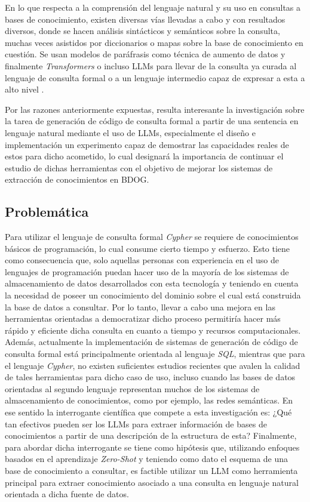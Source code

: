En lo que respecta a la comprensión del lenguaje natural y su uso en consultas a bases de conocimiento, existen diversas vías llevadas a cabo y con resultados diversos, donde se hacen análisis sintácticos y semánticos sobre la consulta, muchas veces asistidos por diccionarios o mapas sobre la base de conocimiento en cuestión. Se usan modelos de paráfrasis como técnica de aumento de datos y finalmente \textit{Transformers} o incluso LLMs para llevar de la consulta ya curada al lenguaje de consulta formal o a un lenguaje intermedio capaz de expresar a esta a alto nivel \cite{text2sql1} \cite{text2cypher1}.

Por las razones anteriormente expuestas, resulta interesante la investigación sobre la tarea de generación de código de consulta formal a partir de una sentencia en lenguaje natural mediante el uso de LLMs, especialmente el diseño e implementación un experimento capaz de demostrar las capacidades reales de estos para dicho acometido, lo cual designará la importancia de continuar el estudio de dichas herramientas con el objetivo de mejorar los sistemas de extracción de conocimientos en BDOG.

\subsection*{Problemática}
Para utilizar el lenguaje de consulta formal \textit{Cypher} se requiere de conocimientos básicos de programación, lo cual consume cierto tiempo y esfuerzo. Esto tiene como consecuencia que, solo aquellas personas con experiencia en el uso de lenguajes de programación puedan hacer uso de la mayoría de los sistemas de almacenamiento de datos desarrollados con esta tecnología y teniendo en cuenta la necesidad de poseer un conocimiento del dominio sobre el cual está construida la base de datos a consultar. Por lo tanto, llevar a cabo una mejora en las herramientas orientadas a democratizar dicho proceso permitiría hacer más rápido y eficiente dicha consulta en cuanto a tiempo y recursos computacionales. Además, actualmente la implementación de sistemas de generación de código de consulta formal está principalmente orientada al lenguaje \textit{SQL}, mientras que para el lenguaje \textit{Cypher}, no existen suficientes estudios recientes que avalen la calidad de tales herramientas para dicho caso de uso, incluso cuando las bases de datos orientadas al segundo lenguaje representan muchos de los sistemas de almacenamiento de conocimientos, como por ejemplo, las redes semánticas. En ese sentido la interrogante científica que compete a esta investigación es: ¿Qué tan efectivos pueden ser los LLMs para extraer información de bases de conocimientos a partir de una descripción de la estructura de esta? Finalmente, para abordar dicha interrogante se tiene como hipótesis que, utilizando enfoques basados en el aprendizaje \textit{Zero-Shot} y teniendo como dato el esquema de una base de conocimiento a consultar, es factible utilizar un LLM como herramienta principal para extraer conocimiento asociado a una consulta en lenguaje natural orientada a dicha fuente de datos.

